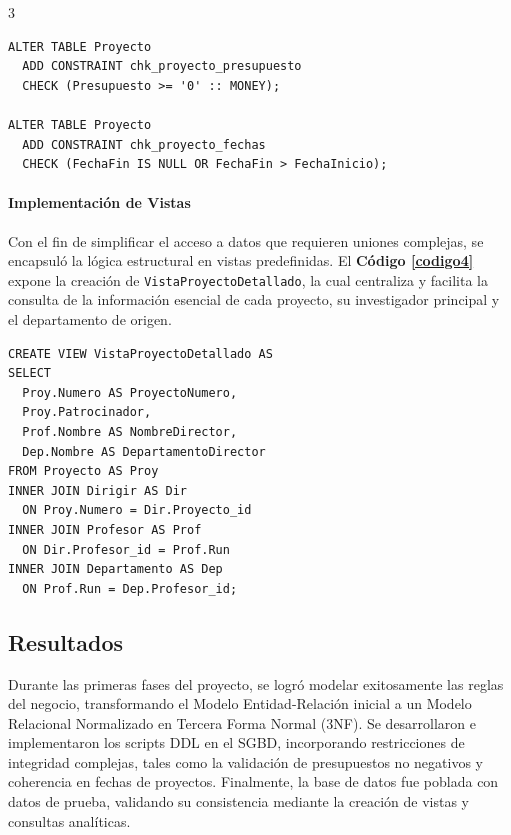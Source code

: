 \documentclass[a0,portrait]{a0poster}
\begin{document}
\begin{multicols}{3}
\begin{lstlisting}[caption=Restricciones de dominio en la tabla Proyecto, label=codigo3]
ALTER TABLE Proyecto
  ADD CONSTRAINT chk_proyecto_presupuesto
  CHECK (Presupuesto >= '0' :: MONEY);

ALTER TABLE Proyecto
  ADD CONSTRAINT chk_proyecto_fechas
  CHECK (FechaFin IS NULL OR FechaFin > FechaInicio);
\end{lstlisting}

\paragraph*{Implementación de Vistas}
Con el fin de simplificar el acceso a datos que requieren uniones complejas, se encapsuló la lógica estructural en vistas predefinidas. El \textbf{Código \ref{codigo4}} expone la creación de \texttt{VistaProyectoDetallado}, la cual centraliza y facilita la consulta de la información esencial de cada proyecto, su investigador principal y el departamento de origen.

\begin{lstlisting}[caption=Creación de vista para proyectos detallados, label=codigo4]
CREATE VIEW VistaProyectoDetallado AS
SELECT
  Proy.Numero AS ProyectoNumero,
  Proy.Patrocinador,
  Prof.Nombre AS NombreDirector,
  Dep.Nombre AS DepartamentoDirector
FROM Proyecto AS Proy
INNER JOIN Dirigir AS Dir
  ON Proy.Numero = Dir.Proyecto_id
INNER JOIN Profesor AS Prof
  ON Dir.Profesor_id = Prof.Run
INNER JOIN Departamento AS Dep
  ON Prof.Run = Dep.Profesor_id;
\end{lstlisting}
\subsection*{Resultados}
Durante las primeras fases del proyecto, se logró modelar exitosamente las reglas del negocio, transformando el Modelo Entidad-Relación inicial a un Modelo Relacional Normalizado en Tercera Forma Normal (3NF). Se desarrollaron e implementaron los scripts DDL en el SGBD, incorporando restricciones de integridad complejas, tales como la validación de presupuestos no negativos y coherencia en fechas de proyectos. Finalmente, la base de datos fue poblada con datos de prueba, validando su consistencia mediante la creación de vistas y consultas analíticas.






\end{multicols}
\end{document}
